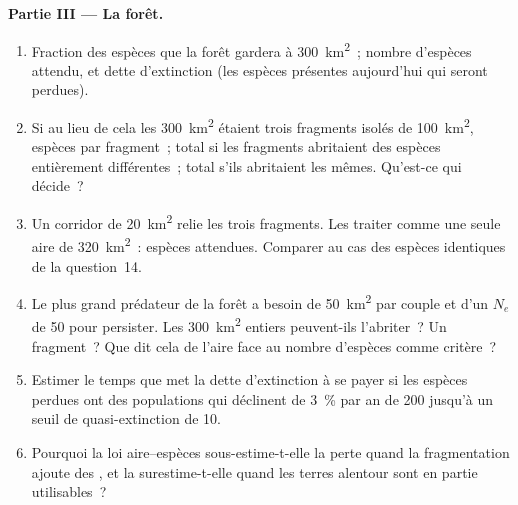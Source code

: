 \begin{problem}
\medskip
\noindent\textbf{Partie III --- La forêt.}
\begin{enumerate}[resume]
  \item Fraction des espèces que la forêt gardera à \qty{300}{km^2}~;
        nombre d'espèces attendu, et dette d'extinction (les espèces
        présentes aujourd'hui qui seront perdues).
  \item Si au lieu de cela les \qty{300}{km^2} étaient trois fragments
        isolés de \qty{100}{km^2}, espèces par fragment~; total si les
        fragments abritaient des espèces entièrement différentes~; total
        s'ils abritaient les mêmes. Qu'est-ce qui décide~?
  \item Un corridor de \qty{20}{km^2} relie les trois fragments. Les
        traiter comme une seule aire de \qty{320}{km^2}~: espèces
        attendues. Comparer au cas des espèces identiques de la
        question~14.
  \item Le plus grand prédateur de la forêt a besoin de \qty{50}{km^2}
        par couple et d'un $N_{e}$ de 50 pour persister. Les
        \qty{300}{km^2} entiers peuvent-ils l'abriter~? Un fragment~? Que
        dit cela de l'aire face au nombre d'espèces comme critère~?
  \item Estimer le temps que met la dette d'extinction à se payer si les
        espèces perdues ont des populations qui déclinent de \qty{3}{\%}
        par an de 200 jusqu'à un seuil de quasi-extinction de 10.
  \item Pourquoi la loi aire--espèces sous-estime-t-elle la perte quand
        la fragmentation ajoute des , et la
        surestime-t-elle quand les terres alentour sont en partie
        utilisables~?
\end{enumerate}


\end{problem}
